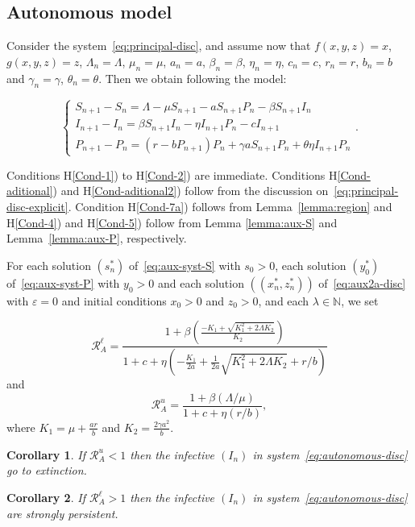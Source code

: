 \documentclass[reqno]{amsart}
\newtheorem{corollary}{Corollary}
\newcommand{\eps}{\varepsilon}
\newcommand{\N}{\ensuremath{\mathds N}}
\begin{document}
{{%
\subsection{Autonomous model}
Consider the system~\eqref{eq:principal-disc}, and assume now that $f(x,y,z)=x$, $g(x,y,z)=z$, $\Lambda_n=\Lambda$, $\mu_n=\mu$, $a_n=a$, $\beta_n=\beta$, $\eta_n=\eta$, $c_n=c$, $r_n=r$, $b_n=b$ and $\gamma_n=\gamma$, $\theta_n=\theta$. Then we obtain following the model:

\begin{equation}\label{eq:autonomous-disc}
\begin{cases}
S_{n+1}-S_n=\Lambda-\mu S_{n+1}-aS_{n+1}P_n-\beta S_{n+1}I_n\\
I_{n+1}-I_n=\beta S_{n+1}I_n-\eta I_{n+1}P_n-cI_{n+1}\\
P_{n+1}-P_n=(r-bP_{n+1})P_n+\gamma aS_{n+1}P_n+\theta\eta I_{n+1}P_n
\end{cases}.
\end{equation}

Conditions H\ref{Cond-1}) to H\ref{Cond-2}) are immediate. Conditions H\ref{Cond-aditional}) and H\ref{Cond-aditional2}) follow from the discussion on~\eqref{eq:principal-disc-explicit}. Condition H\ref{Cond-7a}) follows from Lemma~\ref{lemma:region} and H\ref{Cond-4}) and  H\ref{Cond-5}) follow from Lemma \ref{lemma:aux-S} and Lemma~\ref{lemma:aux-P}, respectively.

For each solution $(s^*_n)$ of~\eqref{eq:aux-syst-S} with $s_0>0$, each solution $(y^*_0)$ of~\eqref{eq:aux-syst-P} with $y_0>0$ and each solution $((x^*_n,z^*_n))$ of~\eqref{eq:aux2a-disc} with $\eps=0$ and initial conditions $x_0>0$ and $z_0>0$, and each $\lambda \in \N$, we set

\[\mathcal R_{A}^\ell=\dfrac{1+\beta\left(\frac{-K_1+\sqrt{K_1^2+2\Lambda K_2}}{K_2}\right) }{1+c+\eta \left(-\frac{K_1}{2a}+\frac{1}{2a}\sqrt{K_1^2+2\Lambda K_2}+r/b\right)}\]
and
\[\mathcal R_{A}^u=\dfrac{1+\beta \left(\Lambda/\mu\right) }{1+c+\eta \left(r/b\right)  },\]
where $K_1=\mu+\frac{ar}{b}$ and $K_2=\frac{2\gamma a^2}{b}.$

\begin{corollary}
If $\mathcal R_{A}^u<1$ then the infective $(I_n)$ in system~\eqref{eq:autonomous-disc} go to extinction.
\end{corollary}

\begin{corollary}
If $\mathcal R_{A}^\ell>1$ then the infective $(I_n)$ in system~\eqref{eq:autonomous-disc} are strongly persistent.
\end{corollary}

}}
\end{document}
